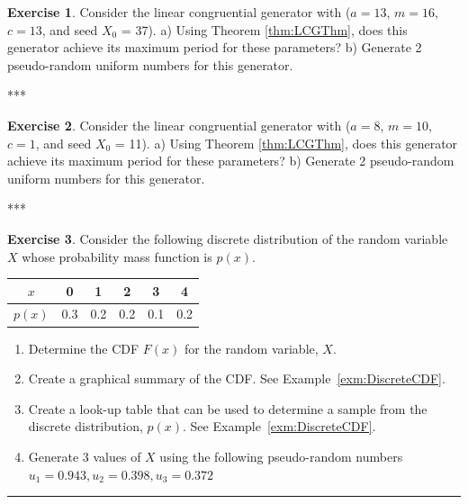 \documentclass[
]{book}
\providecommand{\tightlist}{%
  \setlength{\itemsep}{0pt}\setlength{\parskip}{0pt}}
\theoremstyle{definition}
\theoremstyle{definition}
\theoremstyle{definition}
\newtheorem{exercise}{Exercise}[chapter]
\theoremstyle{definition}
\theoremstyle{remark}
\begin{document}
\begin{exercise}
\protect\hypertarget{exr:AppRNRVP6}{}{\label{exr:AppRNRVP6} }Consider the linear congruential generator with (\(a = 13\), \(m = 16\), \(c = 13\), and
seed \(X_0\) = 37). a) Using Theorem \ref{thm:LCGThm}, does this generator achieve its maximum period for these parameters? b) Generate 2 pseudo-random uniform numbers for this generator.
\end{exercise}
***

\begin{exercise}
\protect\hypertarget{exr:AppRNRVP7}{}{\label{exr:AppRNRVP7} }Consider the linear congruential generator with (\(a = 8\), \(m = 10\), \(c = 1\), and
seed \(X_0\) = 11). a) Using Theorem \ref{thm:LCGThm}, does this generator achieve its maximum period for these parameters? b) Generate 2 pseudo-random uniform numbers for this generator.
\end{exercise}
***

\begin{exercise}
\protect\hypertarget{exr:AppRNRVP8}{}{\label{exr:AppRNRVP8} }Consider the following discrete distribution of the random variable \(X\) whose
probability mass function is \(p(x)\).
\end{exercise}

\begin{longtable}[]{@{}cccccc@{}}
\toprule
\(x\) & 0 & 1 & 2 & 3 & 4 \\
\midrule
\endhead
\(p(x)\) & 0.3 & 0.2 & 0.2 & 0.1 & 0.2 \\
\bottomrule
\end{longtable}

\begin{enumerate}
\def\labelenumi{\alph{enumi}.}
\tightlist
\item
  Determine the CDF \(F(x)\) for the random variable, \(X\).
\item
  Create a graphical summary of the CDF. See Example~\ref{exm:DiscreteCDF}.
\item
  Create a look-up table that can be used to determine a sample from the discrete
  distribution, \(p(x)\). See Example~\ref{exm:DiscreteCDF}.
\item
  Generate 3 values of \(X\) using the following pseudo-random numbers \(u_1= 0.943, u_2 = 0.398, u_3 = 0.372\)
\end{enumerate}

\begin{center}\rule{0.5\linewidth}{0.5pt}\end{center}
\end{document}
